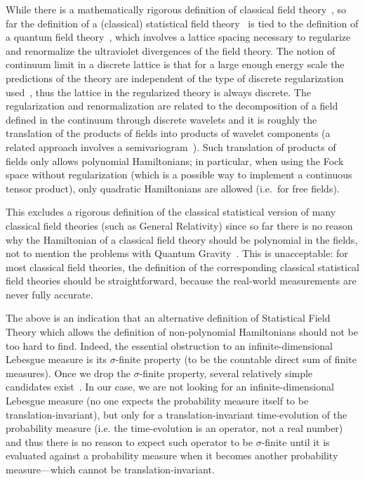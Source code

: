 \documentclass[11pt]{book}
\begin{document}
While there is a mathematically rigorous definition of classical field
theory~\cite{Sardanashvily2008Classical}, so far the definition of a (classical) statistical field
theory~\cite{Mussardo2010Statistical}
is tied to the definition of a quantum field
theory~\cite{Lang1986On}, which involves
a lattice spacing necessary to regularize and renormalize the
ultraviolet divergences of the field theory. The notion of continuum
limit in a discrete lattice is that for a large enough energy scale the
predictions of the theory are independent of the type of discrete
regularization used~\cite{Lang1986On},
thus the lattice in the regularized theory is always discrete. The
regularization and renormalization are related to the decomposition of a
field defined in the continuum through discrete wavelets and it is
roughly the translation of the products of fields into products of
wavelet components\cite{Battle1999Wavelets} (a related approach involves a
semivariogram~\cite{Oliver2005Statistical}). Such translation of products of fields only
allows polynomial Hamiltonians; in particular, when using the Fock space
without regularization (which is a possible way to implement a
continuous tensor product\cite{AttalFock}), only quadratic Hamiltonians are allowed (i.e.~for free fields).

This excludes a rigorous definition of the classical statistical version
of many classical field theories (such as General Relativity) since so
far there is no reason why the Hamiltonian of a classical field theory
should be polynomial in the fields, not to mention the problems with
Quantum
Gravity~\cite{Katanaev2006Polynomial}. This is unacceptable: for most classical field theories, the
definition of the corresponding classical statistical field theories
should be straightforward, because the real-world measurements are never
fully accurate.

The above is an indication that an alternative definition of Statistical
Field Theory which allows the definition of non-polynomial Hamiltonians
should not be too hard to find. Indeed, the essential obstruction to an
infinite-dimensional Lebesgue measure is its \(\sigma\)-finite property
(to be the countable direct sum of finite
measures)\cite{Baker1991ux201cLebesgue}\cite{Baker2004ux201cLebesgue}.
Once we drop the \(\sigma\)-finite property, several relatively simple
candidates exist~\cite{Baker1991ux201cLebesgue}\cite{Baker2004ux201cLebesgue}. In
our case, we are not looking for an infinite-dimensional Lebesgue
measure (no one expects the probability measure itself to be
translation-invariant), but only for a translation-invariant
time-evolution of the probability measure (i.e. the time-evolution is an
operator, not a real number) and thus there is no reason to expect such
operator to be \(\sigma\)-finite until it is evaluated against a
probability measure when it becomes another probability measure---which
cannot be translation-invariant.
\end{document}
